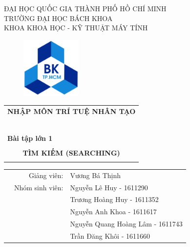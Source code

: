 \documentclass[a4paper, 11pt]{article}
\begin{document}
\begin{titlepage}
	\begin{center}
		ĐẠI HỌC QUỐC GIA THÀNH PHỐ HỒ CHÍ MINH \\
		TRƯỜNG ĐẠI HỌC BÁCH KHOA \\
		KHOA KHOA HỌC - KỸ THUẬT MÁY TÍNH
	\end{center}

	\vspace{1cm}

	\begin{figure}[h!]
		\begin{center}
			\includegraphics[width=3cm]{hcmut.png}
		\end{center}
	\end{figure}

	\vspace{1cm}


	\begin{center}
		\begin{tabular}{c}
			\multicolumn{1}{l}{\textbf{{\Large NHẬP MÔN TRÍ TUỆ NHÂN TẠO}}} \\
			~~                                                              \\
			\hline
			\\
			\multicolumn{1}{l}{\textbf{{\Large Bài tập lớn 1}}}             \\
			\\
			\textbf{{\Huge TÌM KIẾM (SEARCHING)}}                           \\
			\\
			\hline
		\end{tabular}
	\end{center}

	\vspace{3cm}

	\begin{table}[h]
		\begin{tabular}{rrl}
			\hspace{5 cm} & Giảng viên:     & Vương Bá Thịnh                   \\
			              & Nhóm sinh viên: & Nguyễn Lê Huy - 1611290          \\
			              &                 & Trương Hoàng Huy - 1611352       \\
			              &                 & Nguyễn Anh Khoa - 1611617        \\
			              &                 & Nguyễn Quang Hoàng Lâm - 1611743 \\
			              &                 & Trần Đăng Khôi - 1611660         \\
		\end{tabular}
	\end{table}


\end{titlepage}
\end{document}
